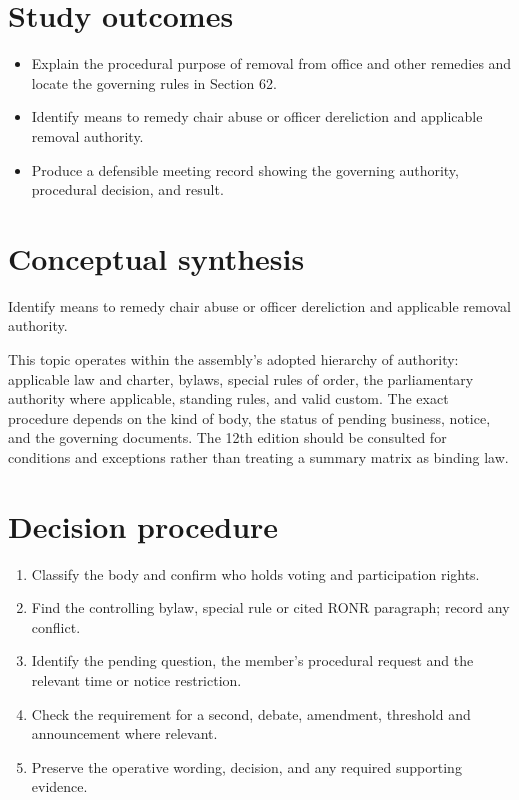 \documentclass[11pt]{article}
\begin{document}
\SuiteOpen
{}
\section{Study outcomes}
\begin{itemize}[leftmargin=*,itemsep=4pt]
\item Explain the procedural purpose of removal from office and other remedies and locate the governing rules in Section 62.
\item Identify means to remedy chair abuse or officer dereliction and applicable removal authority.
\item Produce a defensible meeting record showing the governing authority, procedural decision, and result.
\end{itemize}

\section{Conceptual synthesis}
Identify means to remedy chair abuse or officer dereliction and applicable removal authority.

This topic operates within the assembly’s adopted hierarchy of authority: applicable law and charter, bylaws, special rules of order, the parliamentary authority where applicable, standing rules, and valid custom. The exact procedure depends on the kind of body, the status of pending business, notice, and the governing documents. The 12th edition should be consulted for conditions and exceptions rather than treating a summary matrix as binding law.
\section{Decision procedure}
\begin{enumerate}[leftmargin=*,itemsep=4pt]
\item Classify the body and confirm who holds voting and participation rights.
\item Find the controlling bylaw, special rule or cited RONR paragraph; record any conflict.
\item Identify the pending question, the member’s procedural request and the relevant time or notice restriction.
\item Check the requirement for a second, debate, amendment, threshold and announcement where relevant.
\item Preserve the operative wording, decision, and any required supporting evidence.
\end{enumerate}
\end{document}
